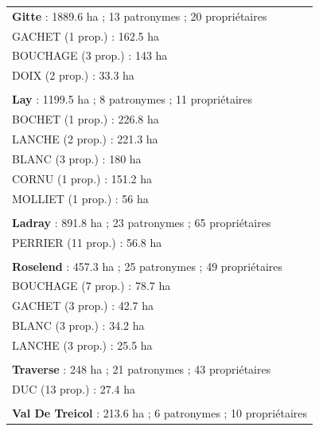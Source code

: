 
\begin{tabular}{l}
\toprule
\textbf{Gitte} : 1889.6 ha ; 13 patronymes ; 20 propriétaires\\
\hspace{1em}GACHET (1 prop.) : 162.5 ha\\
\hspace{1em}BOUCHAGE (3 prop.) : 143 ha\\
\hspace{1em}DOIX (2 prop.) : 33.3 ha\\
\\
\addlinespace
\textbf{Lay} : 1199.5 ha ; 8 patronymes ; 11 propriétaires\\
\hspace{1em}BOCHET (1 prop.) : 226.8 ha\\
\hspace{1em}LANCHE (2 prop.) : 221.3 ha\\
\hspace{1em}BLANC (3 prop.) : 180 ha\\
\hspace{1em}CORNU (1 prop.) : 151.2 ha\\
\addlinespace
\hspace{1em}MOLLIET (1 prop.) : 56 ha\\
\\
\textbf{Ladray} : 891.8 ha ; 23 patronymes ; 65 propriétaires\\
\hspace{1em}PERRIER (11 prop.) : 56.8 ha\\
\\
\addlinespace
\textbf{Roselend} : 457.3 ha ; 25 patronymes ; 49 propriétaires\\
\hspace{1em}BOUCHAGE (7 prop.) : 78.7 ha\\
\hspace{1em}GACHET (3 prop.) : 42.7 ha\\
\hspace{1em}BLANC (3 prop.) : 34.2 ha\\
\hspace{1em}LANCHE (3 prop.) : 25.5 ha\\
\addlinespace
\\
\textbf{Traverse} : 248 ha ; 21 patronymes ; 43 propriétaires\\
\hspace{1em}DUC (13 prop.) : 27.4 ha\\
\\
\textbf{Val De Treicol} : 213.6 ha ; 6 patronymes ; 10 propriétaires\\

\end{tabular}
